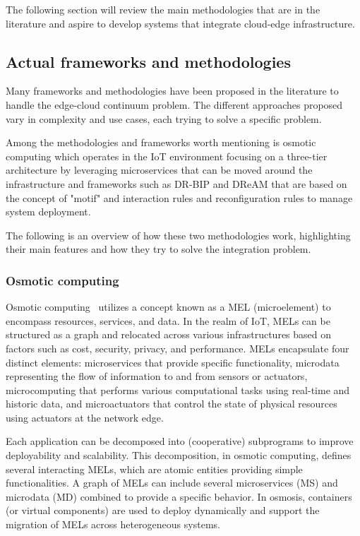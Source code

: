 The following section will review the main methodologies that are in the literature and aspire to develop systems that integrate cloud-edge
infrastructure.

\subsection{Actual frameworks and methodologies}
\label{sec:actual-frameworks-methodologies}

Many frameworks and methodologies have been proposed in the literature to handle the edge-cloud continuum problem. The different approaches
proposed vary in complexity and use cases, each trying to solve a specific problem.

Among the methodologies and frameworks worth mentioning is osmotic computing which operates in the IoT environment focusing on a three-tier
architecture by leveraging microservices that can be moved around the infrastructure and frameworks such as DR-BIP and DReAM that are based on the
concept of "motif" and interaction rules and reconfiguration rules to manage system deployment.

The following is an overview of how these two methodologies work, highlighting their main features and how they try to solve the integration problem.

\subsubsection{Osmotic computing}

Osmotic computing~\cite{8781958} utilizes a concept known as a MEL (microelement) to encompass resources, services, and data. In the realm of IoT,
MELs can be structured as a graph and relocated across various infrastructures based on factors such as cost, security, privacy, and performance.
MELs encapsulate four distinct elements: microservices that provide specific functionality, microdata representing the flow of information to and from
sensors or actuators, microcomputing that performs various computational tasks using real-time and historic data, and microactuators that control the
state of physical resources using actuators at the network edge.

Each application can be decomposed into (cooperative) subprograms to improve deployability and scalability. This decomposition, in osmotic computing,
defines several interacting MELs, which are atomic entities providing simple functionalities. A graph of MELs can include several microservices
(MS) and microdata (MD) combined to provide a specific behavior. In osmosis, containers (or virtual components) are used to deploy dynamically and
support the migration of MELs across heterogeneous systems.

